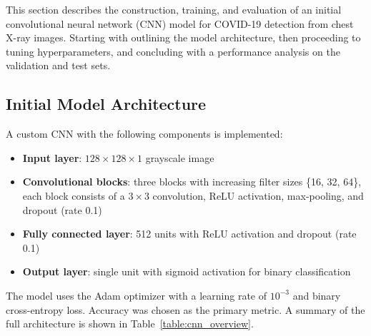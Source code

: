 \documentclass[conference]{IEEEtran}
\begin{document}
This section describes the construction, training, and evaluation of an initial convolutional neural network (CNN) model for COVID-19 detection from chest X-ray images. Starting with outlining the model architecture, then proceeding to tuning hyperparameters, and concluding with a performance analysis on the validation and test sets.

\subsection{Initial Model Architecture}
A custom CNN with the following components is implemented:
\begin{itemize}
	\item \textbf{Input layer}: $128\times128\times1$ grayscale image
	\item \textbf{Convolutional blocks}: three blocks with increasing filter sizes \{16, 32, 64\}, each block consists of a $3\times3$ convolution, ReLU activation, max-pooling, and dropout (rate 0.1)
	\item \textbf{Fully connected layer}: 512 units with ReLU activation and dropout (rate 0.1)
	\item \textbf{Output layer}: single unit with sigmoid activation for binary classification
\end{itemize}

The model uses the Adam optimizer with a learning rate of $10^{-3}$ and binary cross-entropy loss. Accuracy was chosen as the primary metric. A summary of the full architecture is shown in Table~\ref{table:cnn_overview}.
\end{document}
